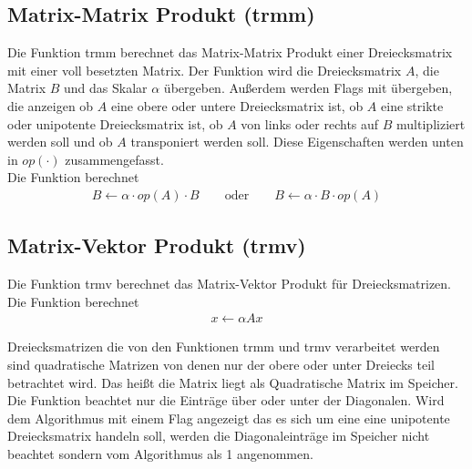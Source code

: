 \subsection{Matrix-Matrix Produkt (trmm)} \label{fkt:trmm}
Die Funktion \glqq trmm\grqq{} berechnet das Matrix-Matrix Produkt einer Dreiecksmatrix mit einer voll besetzten Matrix.
Der Funktion wird die Dreiecksmatrix $A$, die Matrix $B$ und das Skalar $\alpha$ übergeben. Außerdem werden Flags mit übergeben, die anzeigen ob $A$ eine obere oder untere Dreiecksmatrix ist, ob $A$ eine strikte oder unipotente Dreiecksmatrix ist, ob $A$ von links oder rechts auf $B$ multipliziert werden soll und ob $A$ transponiert werden soll. Diese Eigenschaften werden unten in $op(\cdot)$ zusammengefasst. \\
Die Funktion berechnet
\begin{align}
B \leftarrow  \alpha \cdot op(A) \cdot B \qquad \text{oder} \qquad B \leftarrow  \alpha \cdot B \cdot op(A)
\end{align}
\subsection{Matrix-Vektor Produkt (trmv)} \label{fkt:trmv}
Die Funktion \glqq trmv\grqq{} berechnet das Matrix-Vektor Produkt für Dreiecksmatrizen.
Die Funktion berechnet
\begin{align}
x \leftarrow \alpha  Ax %
\end{align}


Dreiecksmatrizen die von den Funktionen \glqq trmm\grqq{} und \glqq trmv\grqq{} verarbeitet werden sind quadratische Matrizen von denen nur der obere oder unter Dreiecks teil betrachtet wird.
Das heißt die Matrix liegt als Quadratische Matrix im Speicher. Die Funktion beachtet nur die Einträge über oder unter der Diagonalen.
Wird dem Algorithmus mit einem Flag angezeigt das es sich um eine eine unipotente Dreiecksmatrix handeln soll, werden die Diagonaleinträge im Speicher nicht beachtet sondern vom Algorithmus als 1 angenommen. \cite{blast}


